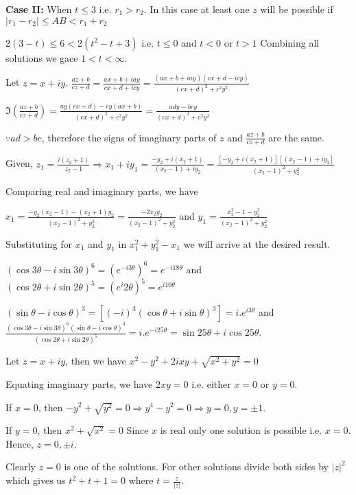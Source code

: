   {\bf Case II:} When $t \leq 3$ i.e. $r_1 > r_2$. In this case at least one $z$ will be possible if $|r_1 -
  r_2| \leq AB < r_1 + r_2$

  $2(3 - t)\leq 6 < 2(t^2 - t + 3)$ i.e. $t \leq 0$ and $t < 0$ or $t > 1$
  Combining all solutions we gace $1 < t < \infty$.
\item Let $z = x + iy$. $\frac{az + b}{cz + d} = \frac{ax + b + iay}{cx + d + icy} = \frac{(ax + b + iay)(cx
  + d - icy)}{(cx + d)^2 + c^2y^2}$

  $\Im\left(\frac{az + b}{cz + d}\right) = \frac{ay(cx + d) - cy(ax + b)}{(cx + d)^2 + c^2y^2} = \frac{ady -
  bcy}{(cx + d)^2 + c^2y^2}$

  $\because ad > bc$, therefore the signs of imaginary parts of $z$ and $\frac{az + b}{cz + d}$ are the same.
\item Given, $z_1 = \frac{i(z_2 + 1)}{z_2 - 1} \Rightarrow x_1 + iy_1 = \frac{-y_2 + i(x_2 + 1)}{(x_2 - 1) + iy_2}
  = \frac{[-y_2 + i(x_2 + 1)][(x_2 - 1) + iy_2]}{(x_2 - 1)^2 + y_2^2}$

  Comparing real and imaginary parts, we have

  $x_1 = \frac{-y_2(x_2 - 1) -(x_2 + 1)y_2}{(x_2 - 1)^2 + y_2^2} = \frac{-2x_2y_2}{(x_2 - 1)^2 + y_2^2}$ and $y_1 = \frac{x_2^2 - 1
    - y_2^2}{(x_2 - 1)^2 + y_2^2}$

  Substituting for $x_1$ and $y_1$ in $x_1^2 + y_1^2 - x_1$ we will arrive at the desired result.
\item $(\cos3\theta - i\sin3\theta)^6 = (e^{-i3\theta})^6 = e^{-i18\theta}$ and $(\cos2\theta +
  i\sin2\theta)^5 = (e^i2\theta)^5 = e^{i10\theta}$

  $(\sin\theta - i\cos\theta)^3 = [(-i)^3(\cos\theta + i\sin\theta)^3] = i.e^{i3\theta}$ and
  $\frac{(\cos3\theta - i\sin3\theta)^6(\sin\theta - i\cos\theta)^3}{(\cos2\theta + i\sin2\theta)^5} =
  i.e^{-i25\theta} = \sin25\theta + i\cos25\theta$.
\item Let $z = x + iy$, then we have $x^2 - y^2 + 2ixy + \sqrt{x^2 + y^2} = 0$

  Equating imaginary parts, we have $2xy = 0$ i.e. either $x = 0$ or $y = 0$.

  If $x = 0$, then $-y^2 + \sqrt{y^2} = 0 \Rightarrow y^4 - y^2 = 0 \Rightarrow y = 0, y = \pm 1$.

  If $y = 0$, then $x^2 + \sqrt{x^2} = 0$ Since $x$ is real only one solution is possible i.e. $x = 0$.
  Hence, $z = 0, \pm i$.
\item Clearly $z = 0$ is one of the solutions. For other solutions divide both sides by $|z|^2$ which gives
  us $t^2 + t + 1 = 0$ where $t = \frac{z}{|z|}$.

